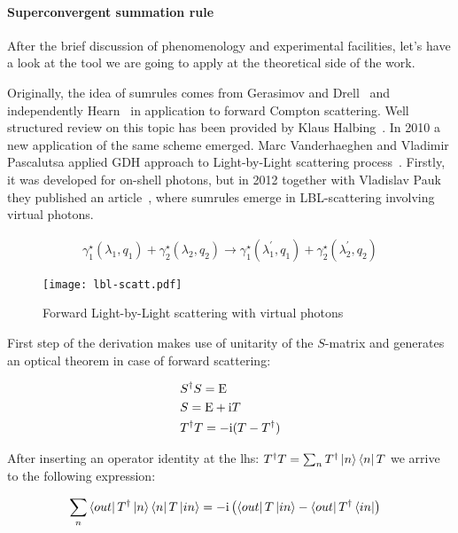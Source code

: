 \paragraph{Superconvergent summation rule}
After the brief discussion of phenomenology and experimental facilities, let's have a look at the tool we are going to apply at the theoretical side of the work.

Originally,  the idea of sumrules comes from Gerasimov and Drell~\cite{gdh-gd-orig} and independently Hearn~\cite{gdh-h-orig} in application to forward Compton scattering. Well structured review on this topic has been provided by Klaus Halbing~\cite{ghd-helbing}. In 2010 a new application of the same scheme emerged. Marc Vanderhaeghen and Vladimir Pascalutsa applied GDH approach to Light-by-Light scattering process~\cite{lbl-sum1}. Firstly, it was developed for on-shell photons, but in 2012 together with Vladislav Pauk they published an article~\cite{lbl-sum2}, where sumrules emerge in LBL-scattering involving virtual photons. 

\begin{align} \label{eq:lbl-scatt}
    \gamma^\star_1(\lambda_1, q_1) + \gamma^\star_2(\lambda_2, q_2) \rightarrow \gamma^\star_1(\lambda_1^\prime, q_1) + \gamma^\star_2(\lambda_2^\prime, q_2) 
\end{align}

\begin{figure}
    \centering
    \texttt{[image: lbl-scatt.pdf]}
    \caption{Forward Light-by-Light scattering with virtual photons \label{fig:lbl-scatt}}
\end{figure}

First step of the derivation makes use of unitarity of the $S$-matrix and generates an optical theorem in case of forward scattering:

\begin{align}
    & S^\dag S = \mathrm{E} \\
    & S = \mathrm{E} + \mathrm{i} T \\
    & T^\dag T = -\mathrm{i}(T - T^\dag)
\end{align}

After inserting an operator identity at the lhs: $T^\dag T = \sum_{n} T^\dag \ket{n}\bra{n} T$ we arrive to the following expression:

\begin{align}
    & \sum_{n} \bra{out} T^\dag \ket{n}\bra{n} T \ket{in} = -\mathrm{i} \left( \bra{out} T \ket{in} - \bra{out} T^\dag \bra{in} \right)
\end{align}

